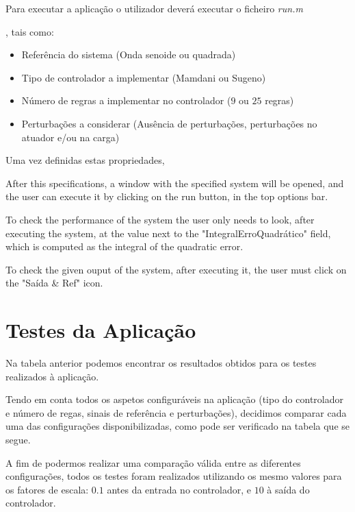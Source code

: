 \documentclass{article}
\begin{document}
Para executar a aplicação o utilizador deverá executar o ficheiro \emph{run.m}

, tais como:

\begin{itemize}
\item Referência do sistema (Onda senoide ou quadrada)
\item Tipo de controlador a implementar (Mamdani ou Sugeno)
\item Número de regras a implementar no controlador ($9$ ou $25$ regras)
\item Perturbações a considerar (Ausência de perturbações, perturbações no atuador e/ou na carga)
\end{itemize}

Uma vez definidas estas propriedades, 

After this specifications, a window with the specified system will be opened, and the user can execute it by clicking on the run button, in the top options bar.

To check the performance of the system the user only needs to look, after executing the system, at the value next to the "IntegralErroQuadrático" field, which is computed as the integral of the quadratic error.

To check the given ouput of the system, after executing it, the user must click on the "Saída & Ref" icon.

\pagebreak

\section{Testes da Aplicação}

\begin{figure}[H]
	
\end{figure}

\pagebreak

Na tabela anterior podemos encontrar os resultados obtidos para os testes realizados à aplicação.

Tendo em conta todos os aspetos configuráveis na aplicação (tipo do controlador e número de regas, sinais de referência e perturbações), decidimos comparar cada uma das configurações disponibilizadas, como pode ser verificado na tabela que se segue.

A fim de podermos realizar uma comparação válida entre as diferentes configurações, todos os testes foram realizados utilizando os mesmo valores para os fatores de escala: $0.1$ antes da entrada no controlador, e $10$ à saída do controlador.
\end{document}
